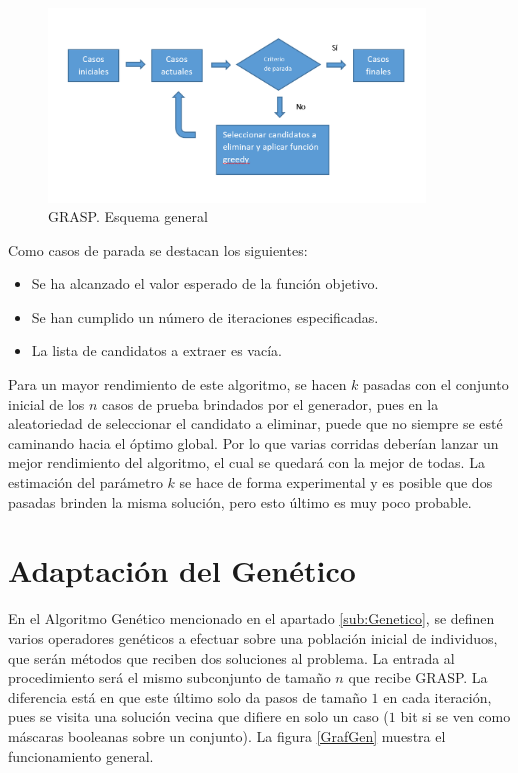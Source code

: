 \documentclass[a4paper,12pt]{book}
\begin{document}
		\begin{figure}[h]
			\centering
			\includegraphics[width=10cm]{./Graphics/GrafGRASP.png}
			\caption{GRASP. Esquema general}
			\label{GrafGRASP}
		\end{figure}
		
		Como casos de parada se destacan los siguientes:
		
		\begin{itemize}
			\item Se ha alcanzado el valor esperado de la función objetivo.
			\item Se han cumplido un número de iteraciones especificadas.
			\item La lista de candidatos a extraer es vacía.
		\end{itemize}
	
		Para un mayor rendimiento de este algoritmo, se hacen $k$ pasadas con el conjunto inicial de los $n$ casos de prueba brindados por el generador, pues en la aleatoriedad de seleccionar el candidato a eliminar, puede que no siempre se esté caminando hacia el óptimo global. Por lo que varias corridas deberían lanzar un mejor rendimiento del algoritmo, el cual se quedará con la mejor de todas. La estimación del parámetro $k$ se hace de forma experimental y es posible que dos pasadas brinden la misma solución, pero esto último es muy poco probable.
		
	\section{Adaptación del Genético}
		En el Algoritmo Genético mencionado en el apartado \ref{sub:Genetico}, se definen varios operadores genéticos a efectuar sobre una población inicial de individuos, que serán métodos que reciben dos soluciones al problema. La entrada al procedimiento será el mismo subconjunto de tamaño $n$ que recibe GRASP. La diferencia está en que este último solo da pasos de tamaño $1$ en cada iteración, pues se visita una solución vecina que difiere en solo un caso ($1$ bit si se ven como máscaras booleanas sobre un conjunto). La figura \ref{GrafGen} muestra el funcionamiento general.
		
\end{document}
